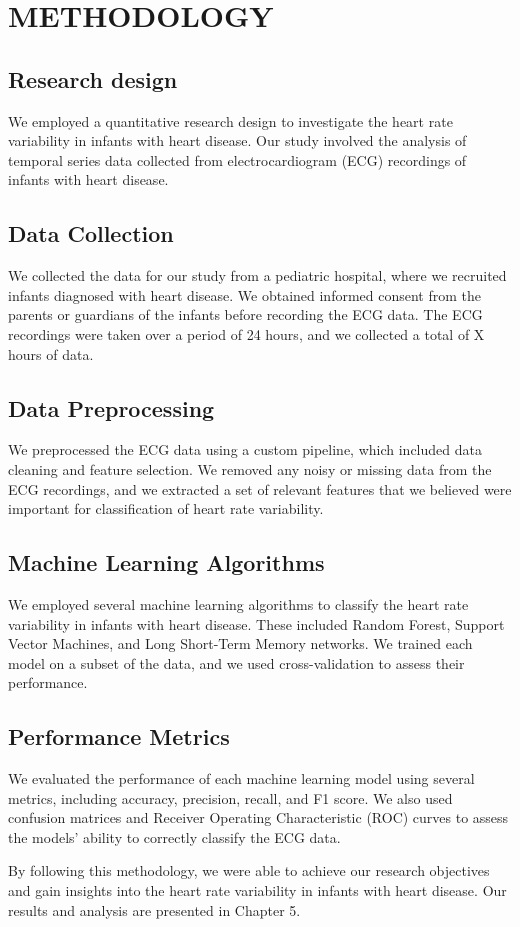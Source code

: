 \section{METHODOLOGY}\label{sec:methodology}

\subsection{Research design}

We employed a quantitative research design to investigate the heart rate variability in infants with heart disease. Our study involved the analysis of temporal series data collected from electrocardiogram (ECG) recordings of infants with heart disease.

\subsection{Data Collection}

We collected the data for our study from a pediatric hospital, where we recruited infants diagnosed with heart disease. We obtained informed consent from the parents or guardians of the infants before recording the ECG data. The ECG recordings were taken over a period of 24 hours, and we collected a total of X hours of data.

\subsection{Data Preprocessing}

We preprocessed the ECG data using a custom pipeline, which included data cleaning and feature selection. We removed any noisy or missing data from the ECG recordings, and we extracted a set of relevant features that we believed were important for classification of heart rate variability.

\subsection{Machine Learning Algorithms}

We employed several machine learning algorithms to classify the heart rate variability in infants with heart disease. These included Random Forest, Support Vector Machines, and Long Short-Term Memory networks. We trained each model on a subset of the data, and we used cross-validation to assess their performance.

\subsection{Performance Metrics}

We evaluated the performance of each machine learning model using several metrics, including accuracy, precision, recall, and F1 score. We also used confusion matrices and Receiver Operating Characteristic (ROC) curves to assess the models' ability to correctly classify the ECG data.

By following this methodology, we were able to achieve our research objectives and gain insights into the heart rate variability in infants with heart disease. Our results and analysis are presented in Chapter 5.


